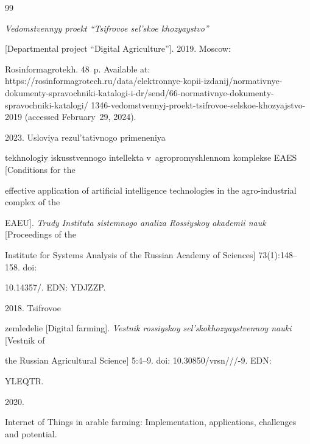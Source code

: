 {\small\frenchspacing

{ %


\begin{thebibliography}{99}


\textit{Vedomstvennyy proekt ``Tsifrovoe sel'skoe khozyaystvo''} 

[Departmental project ``Digital Agriculture'']. 2019. Moscow: 

Rosinformagrotekh. 48~p. Available at: {\sf https://\linebreak rosinformagrotech.ru/data/elektronnye-kopii-izdanij/normativnye-dokumenty-spravochniki-katalogi-i-dr/send/66-normativnye-dokumenty-spravochniki-katalogi/ 1346-vedomstvennyj-proekt-tsifrovoe-selskoe-khozyajstvo-2019} (accessed February~29, 2024).


 2023. Usloviya rezul'tativnogo primeneniya 

tekhnologiy iskusstvennogo intellekta v~agropromyshlennom komplekse EAES [Conditions for the 

effective application of artificial intelligence technologies in the agro-industrial complex of the 

EAEU]. \textit{Trudy Instituta sistemnogo analiza Rossiyskoy akademii nauk} [Proceedings of the 

Institute for Systems Analysis of the Russian Academy of Sciences] 73(1):148--158. doi: 

10.14357\!/. EDN: YDJZZP.


 2018. Tsifrovoe 

zemledelie [Digital farming]. \textit{Vestnik rossiyskoy sel'skokhozyaystvennoy nauki} [Vestnik of 

the Russian Agricultural Science] 5:4--9. doi: 10.30850\!/\!vrsn\!/\!/\!/-9. EDN: 

YLEQTR.




 2020. 

Internet of Things in arable farming: Implementation, applications, challenges and potential. 


\end{thebibliography}}}
